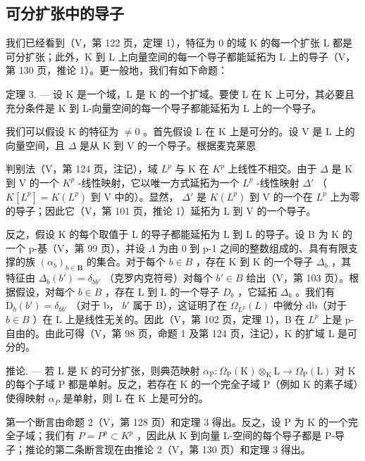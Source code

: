 \subsection{可分扩张中的导子}

我们已经看到（V，第 122 页，定理 1），特征为 0 的域 K 的每一个扩张 L 都是可分扩张；此外，K 到 L 上向量空间的每一个导子都能延拓为 L 上的导子（V，第 130 页，推论 1）。更一般地，我们有如下命题：

定理 3. --- 设 K 是一个域，L 是 K 的一个扩域。要使 L 在 K 上可分，其必要且充分条件是 K 到 L-向量空间的每一个导子都能延拓为 L 上的一个导子。

我们可以假设 K 的特征为 \(\neq0\) 。首先假设 L 在 K 上是可分的。设 V 是 L 上的向量空间，且 \(\Delta\) 是从 K 到 V 的一个导子。根据麦克莱恩

判别法（V，第 124 页，注记），域 \(L^p\) 与 K 在 \(K^p\) 上线性不相交。由于 \(\Delta\) 是 K 到 V 的一个 \(K^p\) -线性映射，它以唯一方式延拓为一个 \(L^p\) -线性映射 \(\Delta'\) （\(K[L^p] = K(L^p)\) 到 V 中的）。显然， \(\Delta'\) 是 \(K(L^p)\) 到 V 的一个在 \(L^p\) 上为零的导子；因此它（V，第 101 页，推论 1）延拓为 L 到 V 的一个导子。

反之，假设 K 的每个取值于 L 的导子都能延拓为 L 到 L 的导子。设 B 为 K 的一个 p-基（V，第 99 页），并设 \(\Lambda\) 为由 0 到 p-1 之间的整数组成的、具有有限支撑的族 \((\alpha_{b})_{b\in\mathbf{B}}\) 的集合。对于每个 \(b\in B\) ，存在 K 到 K 的一个导子 \(\Delta_{b}\) ，其特征由 \(\Delta_{b}(b')=\delta_{bb'}\) （克罗内克符号）对每个 \(b'\in B\) 给出（V，第 103 页）。根据假设，对每个 \(b\in B\) ，存在 L 到 L 的一个导子 \(D_{b}\) ，它延拓 \(\Delta_{b}\) 。我们有 \(\mathrm{D}_{b}(b')=\delta_{bb'}\) （对于 b， \(b'\) 属于 B），这证明了在 \(\Omega_{L^{p}}(L)\) 中微分 db（对于 \(b\in B\) ）在 L 上是线性无关的。因此（V，第 102 页，定理 1），B 在 \(L^{p}\) 上是 p-自由的。由此可得（V，第 98 页，命题 1 及第 124 页，注记），K 的扩域 L 是可分的。

推论. --- 若 L 是 K 的可分扩张，则典范映射 \(\alpha_{\mathrm{P}}:\Omega_{\mathrm{P}}(\mathrm{K})\otimes_{\mathrm{K}}\mathrm{L}\to\Omega_{\mathrm{P}}(\mathrm{L})\) 对 K 的每个子域 P 都是单射。反之，若存在 K 的一个完全子域 P（例如 K 的素子域）使得映射 \(\alpha_{P}\) 是单射，则 L 在 K 上是可分的。

第一个断言由命题 2（V，第 128 页）和定理 3 得出。反之，设 P 为 K 的一个完全子域；我们有 \(P = P^{p} \subset K^{p}\) ，因此从 K 到向量 L-空间的每个导子都是 P-导子；推论的第二条断言现在由推论 2（V，第 130 页）和定理 3 得出。


